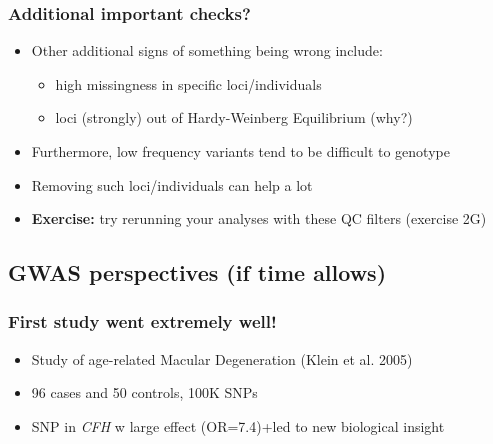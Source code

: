 \documentclass[xcolor=pdftex,dvipsnames,table,10pt]{beamer}
\begin{document}
\begin{frame}
\frametitle{Additional important checks?}
\vspace{-2.4cm}
\small
\begin{itemize}
\item Other additional signs of something being wrong include:
\begin{itemize}
\item high missingness in specific loci/individuals   
\item loci (strongly) out of Hardy-Weinberg Equilibrium (why?)
\end{itemize}
\item Furthermore, low frequency variants tend to be difficult to genotype
\item Removing such loci/individuals can help a lot
\item<2-> \textbf{Exercise:} try rerunning your analyses with these QC filters (exercise 2G)%
\end{itemize}
\end{frame}


\subsection{GWAS perspectives (if time allows)}
\begin{frame}
  \frametitle{First study went extremely well!}
\begin{itemize}
\item Study of age-related Macular Degeneration (Klein et al. 2005)
\item 96 cases and 50 controls, 100K SNPs\\\vspace{0.2cm}
    \begin{figure}\end{figure}    
\item SNP in \textit{CFH} w large effect (OR=7.4)+led to new biological insight 
\end{itemize} %
\end{frame}
\end{document}
